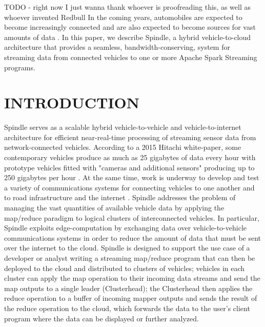 \documentclass{thesis}
\author{William Rory Kronmiller}
\begin{document}
 
\titlepage             %
\tableofcontents       %
\listoftables          %
\listoffigures         %

   TODO - right now I just wanna thank whoever is proofreading this, as well as whoever invented Redbull 
    In the coming years, automobiles are expected to become increasingly connected and are
    also expected to become sources for vast amounts of data \cite{hitachi}. In this paper,
    we describe Spindle, a hybrid vehicle-to-cloud architecture that provides a seamless,
    bandwidth-conserving, system for streaming data from connected vehicles to one or more
    Apache Spark Streaming programs.

\chapter{INTRODUCTION}
    Spindle serves as a scalable hybrid vehicle-to-vehicle and vehicle-to-internet architecture
    for efficient near-real-time processing of streaming sensor data from network-connected vehicles.
    According to a 2015 Hitachi white-paper, some contemporary vehicles produce as much
    as 25 gigabytes of data every hour with prototype vehicles fitted with "cameras and additional
    sensors" producing up to 250 gigabytes per hour \cite{hitachi}. At the same time, work is underway
    to develop and test a variety of communications systems for connecting vehicles to one another
    and to road infrastructure and the internet \cite{connectivitypaper}. Spindle addresses the problem
    of managing the vast quantities of available vehicle data by applying the map/reduce \cite{mapreduce}
    paradigm to logical clusters of interconnected vehicles. In particular, Spindle exploits edge-computation
    by exchanging data over vehicle-to-vehicle communications systems in order to reduce the amount of data
    that must be sent over the internet to the cloud. Spindle is designed to support the use case
    of a developer or analyst writing a streaming map/reduce program that can then be deployed to the cloud
    and distributed to clusters of vehicles; vehicles in each cluster can apply the map operation to their
    incoming data streams and send the map outputs to a single leader (Clusterhead); the Clusterhead then
    applies the reduce operation to a buffer of incoming mapper outputs and sends the result of the reduce
    operation to the cloud, which forwards the data to the user's client program where the data can be
    displayed or further analyzed.
\end{document}
